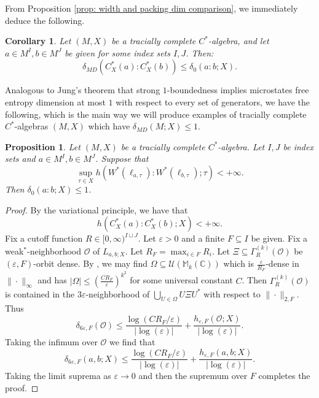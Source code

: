 \documentclass[10pt]{amsart}
\newtheorem{prop}[thm]{Proposition}
\newtheorem{cor}[thm]{Corollary}
\theoremstyle{definition}
\numberwithin{equation}{section}
\newcommand{\bC}{{\mathbb C}}
\newcommand{\bM}{{\mathbb M}}
\newcommand{\cU}{{\mathcal U}}
\begin{document}
From Proposition \ref{prop: width and packing dim comparison}, we immediately deduce the following.

\begin{cor}\label{cor: delta MD and MFED}
Let $(M,X)$ be a tracially complete $C^{*}$-algebra, and let $a\in M^{I},b\in M^{J}$ be given for some index sets $I,J$. Then:
\[\delta_{MD}(C^{*}_{X}(a):C^{*}_{X}(b))\leq \delta_{0}(a:b;X).\]
\end{cor}




Analogous to Jung's theorem that strong $1$-boundedness implies microstates free entropy dimension at most $1$ with respect to every set of generators, we have the following, which is the main way we will produce examples of tracially complete $C^{*}$-algebras $(M,X)$ which have $\delta_{MD}(M;X)\leq 1$.

\begin{prop}\label{prop: delta MD and MFED}
Let $(M,X)$ be a tracially complete $C^{*}$-algebra. Let $I,J$ be index sets and $a\in M^{I},b\in M^{J}$. Suppose that 
\[\sup_{\tau\in X}h(W^{*}(\ell_{a,\tau}):W^{*}(\ell_{b,\tau});\tau)<+\infty.\]
Then $\delta_{0}(a:b;X)\leq 1$.
\end{prop}

\begin{proof}
By the variational principle, \cite[Theorem 6.1]{macmahon20261boundedentropycalgebras} we have that 
\[h(C^{*}_{X}(a):C^{*}_{X}(b);X)<+\infty.\]
Fix a cutoff function $R\in [0,\infty)^{I\sqcup J}.$   
 Let $\varepsilon>0$ and a finite $F\subseteq I$ be given. Fix a weak$^{*}$-neighborhood $\mathcal{O}$  of $L_{a,b;X}$. Let $R_{F}=\max_{i\in F}R_{i}$. Let $\Xi\subseteq \Gamma^{(k)}_{R}(\mathcal{O})$ be $(\varepsilon,F)$-orbit dense. By \cite[Theorem 7]{Szarek}, we may find $\Omega\subseteq \cU(\bM_{k}(\bC))$ which is $\frac{\varepsilon}{R_{F}}$-dense in $\|\cdot\|_{\infty}$ and has $|\Omega|\leq \left(\frac{CR_{F}}{\varepsilon}\right)^{k^{2}}$ for some universal constant $C$. Then $\Gamma^{(k)}_{R}(\mathcal{O})$ is contained in the $3\varepsilon$-neighborhood of $\bigcup_{U\in \Omega}U\Xi U^{*}$ with respect to $\|\cdot\|_{2,F}$.
Thus 
\[\delta_{6\varepsilon,F}(\mathcal{O})\leq \frac{\log(CR_{F}/\varepsilon)}{|\log(\varepsilon)|}+\frac{h_{\varepsilon,F}(\mathcal{O};X)}{|\log(\varepsilon)|}.\]
Taking the infimum over $\mathcal{O}$ we find that
\[\delta_{6\varepsilon,F}(a,b;X)\leq \frac{\log(CR_{F}/\varepsilon)}{|\log(\varepsilon)|}+\frac{h_{\varepsilon,F}(a,b;X)}{|\log(\varepsilon)|}.\]
Taking the limit suprema as $\varepsilon\to 0$ and then the supremum over $F$ completes the proof.

\end{proof}
\end{document}
